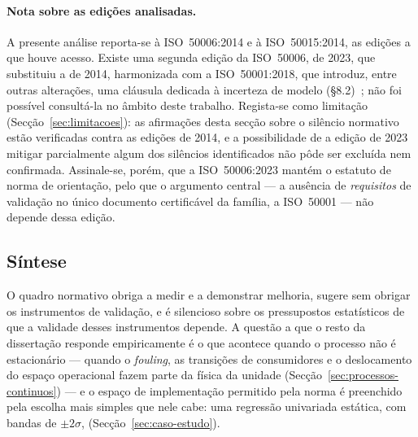 
\paragraph{Nota sobre as edições analisadas.} A presente análise reporta-se à ISO~50006:2014 e à ISO~50015:2014, as edições a que houve acesso.  Existe uma segunda edição da ISO~50006, de 2023, que substituiu a de 2014, harmonizada com a ISO~50001:2018, que introduz, entre outras alterações, uma cláusula dedicada à incerteza de modelo (\S8.2)~\cite{ISO50006_2023}; não foi possível consultá-la no âmbito deste trabalho. Regista-se como limitação (Secção~\ref{sec:limitacoes}): as afirmações desta secção sobre o silêncio normativo estão verificadas contra as edições de 2014, e a possibilidade de a edição de 2023 mitigar parcialmente algum dos silêncios identificados não pôde ser excluída nem confirmada. Assinale-se, porém, que a ISO~50006:2023 mantém o estatuto de norma de orientação, pelo que o argumento central --- a ausência de \emph{requisitos} de validação no único documento certificável da família, a ISO~50001 --- não depende dessa edição.

\subsection{Síntese}
\label{sec:assimetria-sintese}

O quadro normativo obriga a medir e a demonstrar melhoria, sugere sem obrigar os instrumentos de validação, e é silencioso sobre os pressupostos estatísticos de que a validade desses instrumentos depende.  A questão a que o resto da dissertação responde empiricamente é o que acontece quando o processo não é estacionário --- quando o \emph{fouling}, as transições de consumidores e o deslocamento do espaço operacional fazem parte da física da unidade (Secção~\ref{sec:processos-continuos}) --- e o espaço de implementação permitido pela norma é preenchido pela escolha mais simples que nele cabe: uma regressão univariada estática, com bandas de $\pm 2\sigma$,
 (Secção~\ref{sec:caso-estudo}).

